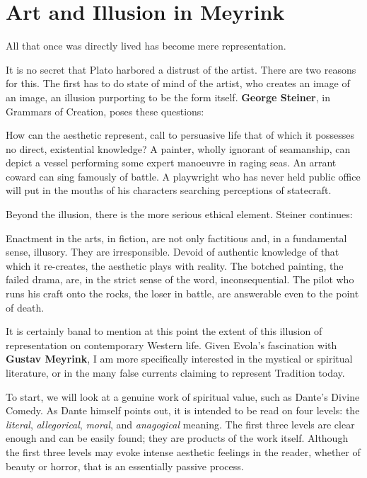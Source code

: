 \section{Art and Illusion in Meyrink}

\begin{quotex}
All that once was directly lived has become mere representation. 

\end{quotex}
It is no secret that Plato harbored a distrust of the artist. There are two reasons for this. The first has to do state of mind of the artist, who creates an image of an image, an illusion purporting to be the form itself. \textbf{George Steiner}, in Grammars of Creation, poses these questions:

\begin{quotex}
How can the aesthetic represent, call to persuasive life that of which it possesses no direct, existential knowledge? A painter, wholly ignorant of seamanship, can depict a vessel performing some expert manoeuvre in raging seas. An arrant coward can sing famously of battle. A playwright who has never held public office will put in the mouths of his characters searching perceptions of statecraft. 

\end{quotex}
Beyond the illusion, there is the more serious ethical element. Steiner continues:

\begin{quotex}
Enactment in the arts, in fiction, are not only factitious and, in a fundamental sense, illusory. They are irresponsible. Devoid of authentic knowledge of that which it re-creates, the aesthetic plays with reality. The botched painting, the failed drama, are, in the strict sense of the word, inconsequential. The pilot who runs his craft onto the rocks, the loser in battle, are answerable even to the point of death. 

\end{quotex}
It is certainly banal to mention at this point the extent of this illusion of representation on contemporary Western life. Given Evola's fascination with \textbf{Gustav Meyrink}, I am more specifically interested in the mystical or spiritual literature, or in the many false currents claiming to represent Tradition today.

To start, we will look at a genuine work of spiritual value, such as Dante's Divine Comedy. As Dante himself points out, it is intended to be read on four levels: the \emph{literal}, \emph{allegorical}, \emph{moral}, and \emph{anagogical }meaning. The first three levels are clear enough and can be easily found; they are products of the work itself. Although the first three levels may evoke intense aesthetic feelings in the reader, whether of beauty or horror, that is an essentially passive process.

